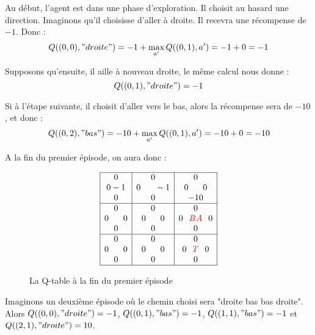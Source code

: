 Au début, l'agent est dans une phase d'exploration. Il choisit au hasard une direction. Imaginons qu'il choisisse d'aller à droite. Il recevra une récompense de $-1$. Donc : 
$$Q((0,0), "droite") = -1 + \max_{a'} Q((0,1), a') = -1+0 = -1$$

Supposons qu'ensuite, il aille à nouveau droite, le même calcul nous donne : 
$$Q((0,1), "droite") = -1$$

Si à l'étape suivante, il choisit d'aller vers le bas, alors la récompense sera de $-10$, et donc : $$Q((0,2), "bas") = -10 + \max_{a'} Q((0,1), a') = -10+0 = -10$$

A la fin du premier épisode, on aura donc : 
\begin{figure}[!ht]
\centering
$$\begin{array}{|c|c|c|}
\hline
0                      & 0                           & 0 \\
0 -1 & 0 \hspace*{0.6cm} -1 & 0\hspace*{0.6cm}0 \\
0          & 0          & -10 \\
\hline
0          & 0                            & 0 \\
0\hspace*{0.6cm}0   & 0\hspace*{0.6cm} 0                  & 0\hspace*{0.25cm}\textcolor{red}{B A}\hspace*{0.25cm} 0 \\
0           & 0          & 0 \\
\hline
0          & 0                         & 0\\
0\hspace*{0.6cm} 0                     & 0\hspace*{0.6cm}0                & 0\hspace*{0.25cm}\textcolor{red}{T}\hspace*{0.25cm} 0 \\
0                            & 0        & 0 \\
\hline
\end{array}
$$
\caption{La Q-table à la fin du premier épisode}
\end{figure}

Imaginons un deuxième épisode où le chemin choisi sera "droite bas bas droite". 
Alors $Q((0,0), "droite")=-1$, $Q((0,1), "bas")=-1$, $Q((1,1), "bas")=-1$ et $Q((2,1), "droite")=10$.

